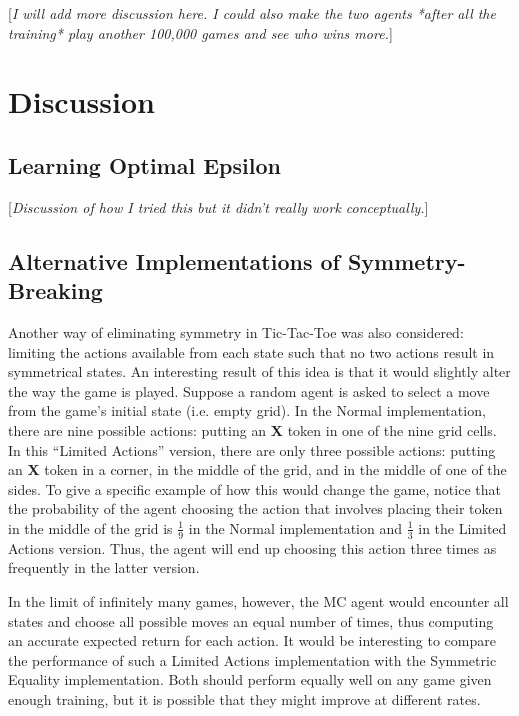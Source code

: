 \documentclass[11pt,a4paper]{report}
\begin{document}
[\emph{I will add more discussion here. I could also make the two agents *after all the training* play another 100,000 games and see who wins more.}]


\chapter{Discussion}

\section{Learning Optimal Epsilon}

[\emph{Discussion of how I tried this but it didn't really work conceptually.}]

\section{Alternative Implementations of Symmetry-Breaking}

Another way of eliminating symmetry in Tic-Tac-Toe was also considered: limiting the actions available from each state such that no two actions result in symmetrical states. An interesting result of this idea is that it would slightly alter the way the game is played. Suppose a random agent is asked to select a move from the game's initial state (i.e. empty grid). In the Normal implementation, there are nine possible actions: putting an \textbf{X} token in one of the nine grid cells. In this ``Limited Actions'' version, there are only three possible actions: putting an \textbf{X} token in a corner, in the middle of the grid, and in the middle of one of the sides. To give a specific example of how this would change the game, notice that the probability of the agent choosing the action that involves placing their token in the middle of the grid is $\frac{1}{9}$ in the Normal implementation and $\frac{1}{3}$ in the Limited Actions version. Thus, the agent will end up choosing this action three times as frequently in the latter version.

In the limit of infinitely many games, however, the MC agent would encounter all states and choose all possible moves an equal number of times, thus computing an accurate expected return for each action. It would be interesting to compare the performance of such a Limited Actions implementation with the Symmetric Equality implementation. Both should perform equally well on any game given enough training, but it is possible that they might improve at different rates.
\end{document}
